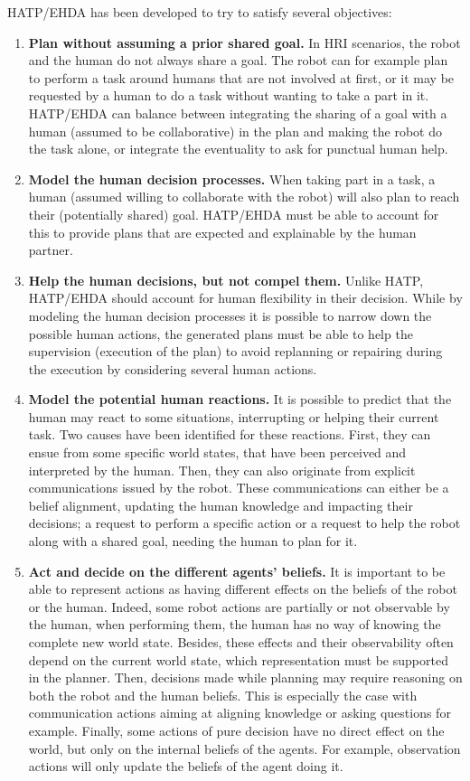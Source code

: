 HATP/EHDA has been developed to try to satisfy several objectives: 
\begin{enumerate}
    \item \textbf{Plan without assuming a prior shared goal.} In HRI scenarios, the robot and the human do not always share a goal. The robot can for example plan to perform a task around humans that are not involved at first, or it may be requested by a human to do a task without wanting to take a part in it. HATP/EHDA can balance between integrating the sharing of a goal with a human (assumed to be collaborative) in the plan and making the robot do the task alone, or integrate the eventuality to ask for punctual human help. 

    \item \textbf{Model the human decision processes.} When taking part in a task, a human (assumed willing to collaborate with the robot) will also plan to reach their (potentially shared) goal. HATP/EHDA must be able to account for this to provide plans that are expected and explainable by the human partner.

    \item \textbf{Help the human decisions, but not compel them.} Unlike HATP, HATP/EHDA should account for human flexibility in their decision. While by modeling the human decision processes it is possible to narrow down the possible human actions, the generated plans must be able to help the supervision (execution of the plan) to avoid replanning or repairing during the execution by considering several human actions.

    \item \textbf{Model the potential human reactions.} It is possible to predict that the human may react to some situations, interrupting or helping their current task. Two causes have been identified for these reactions. First, they can ensue from some specific world states, that have been perceived and interpreted by the human. Then, they can also originate from explicit communications issued by the robot. These communications can either be a belief alignment, updating the human knowledge and impacting their decisions; a request to perform a specific action or a request to help the robot along with a shared goal, needing the human to plan for it.

    \item \textbf{Act and decide on the different agents' beliefs.} It is important to be able to represent actions as having different effects on the beliefs of the robot or the human. Indeed, some robot actions are partially or not observable by the human, when performing them, the human has no way of knowing the complete new world state. Besides, these effects and their observability often depend on the current world state, which representation must be supported in the planner. Then, decisions made while planning may require reasoning on both the robot and the human beliefs. This is especially the case with communication actions aiming at aligning knowledge or asking questions for example. Finally, some actions of pure decision have no direct effect on the world, but only on the internal beliefs of the agents. For example, observation actions will only update the beliefs of the agent doing it.


\end{enumerate}
